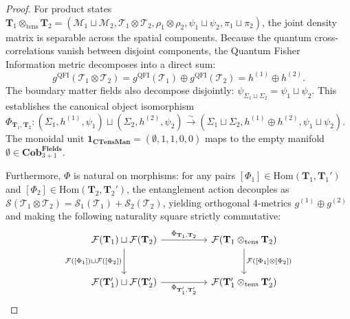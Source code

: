 \documentclass[11pt,a4paper,reqno]{amsart}
\theoremstyle{definition}
\numberwithin{equation}{section}
\newcommand{\CTens}{\mathbf{CTensMan}}
\newcommand{\Cob}{\mathbf{Cob}_{3+1}^{\mathbf{Fields}}}
\newcommand{\QFI}{\mathrm{QFI}}
\begin{document}
\begin{proof}
For product states $\mathbf{T}_1 \otimes_{\mathrm{tens}} \mathbf{T}_2 = (\mathcal{M}_1 \sqcup \mathcal{M}_2, \mathcal{T}_1 \otimes \mathcal{T}_2, \rho_1 \otimes \rho_2, \psi_1 \sqcup \psi_2, \pi_1 \sqcup \pi_2)$, the joint density matrix is separable across the spatial components. Because the quantum cross-correlations vanish between disjoint components, the Quantum Fisher Information metric decomposes into a direct sum:
\begin{equation}
    g^{\QFI}(\mathcal{T}_1 \otimes \mathcal{T}_2) = g^{\QFI}(\mathcal{T}_1) \oplus g^{\QFI}(\mathcal{T}_2) = h^{(1)} \oplus h^{(2)}.
\end{equation}
The boundary matter fields also decompose disjointly: $\psi_{\Sigma_1 \sqcup \Sigma_2} = \psi_1 \sqcup \psi_2$. This establishes the canonical object isomorphism $\Phi_{\mathbf{T}_1, \mathbf{T}_2}: (\Sigma_1, h^{(1)}, \psi_1) \sqcup (\Sigma_2, h^{(2)}, \psi_2) \xrightarrow{\sim} (\Sigma_1 \sqcup \Sigma_2, h^{(1)} \oplus h^{(2)}, \psi_1 \sqcup \psi_2)$. The monoidal unit $\mathbf{1}_{\CTens} = (\emptyset, 1, 1, 0, 0)$ maps to the empty manifold $\emptyset \in \Cob$.

Furthermore, $\Phi$ is natural on morphisms: for any pairs $[\Phi_1] \in \mathrm{Hom}(\mathbf{T}_1, \mathbf{T}_1')$ and $[\Phi_2] \in \mathrm{Hom}(\mathbf{T}_2, \mathbf{T}_2')$, the entanglement action decouples as $\mathcal{S}(\mathcal{T}_1 \otimes \mathcal{T}_2) = \mathcal{S}_1(\mathcal{T}_1) + \mathcal{S}_2(\mathcal{T}_2)$, yielding orthogonal 4-metrics $g^{(1)} \oplus g^{(2)}$ and making the following naturality square strictly commutative:
\begin{equation}
\begin{tikzcd}[column sep=huge, row sep=large]
\mathcal{F}(\mathbf{T}_1) \sqcup \mathcal{F}(\mathbf{T}_2) \arrow[r, "\Phi_{\mathbf{T}_1, \mathbf{T}_2}"] \arrow[d, "{\mathcal{F}([\Phi_1]) \sqcup \mathcal{F}([\Phi_2])}"'] & \mathcal{F}(\mathbf{T}_1 \otimes_{\mathrm{tens}} \mathbf{T}_2) \arrow[d, "{\mathcal{F}([\Phi_1] \otimes [\Phi_2])}"] \\
\mathcal{F}(\mathbf{T}_1') \sqcup \mathcal{F}(\mathbf{T}_2') \arrow[r, "\Phi_{\mathbf{T}_1', \mathbf{T}_2'}"'] & \mathcal{F}(\mathbf{T}_1' \otimes_{\mathrm{tens}} \mathbf{T}_2')
\end{tikzcd}
\end{equation}


\end{proof}
\end{document}
